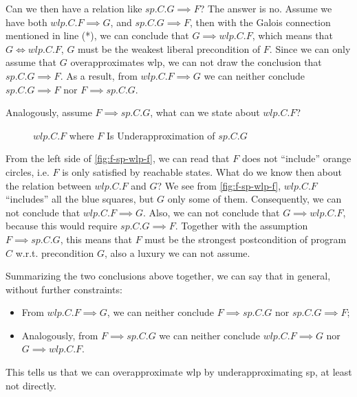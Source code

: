 Can we then have a relation like $sp.C.G\implies F$? 
The answer is no. Assume we have both $wlp.C.F\implies G$, and $sp.C.G\implies F$, then with the Galois connection mentioned in line (*), we can conclude that $G\implies wlp.C.F$, which means that $G\Leftrightarrow wlp.C.F$, $G$ must be  the weakest liberal precondition of $F$. 
Since we can only assume that $G$ overapproximates wlp, we can not draw the conclusion that $sp.C.G\implies F$. 
As a result, from $wlp.C.F\implies G$ we can neither conclude $sp.C.G\implies F$ nor $F\implies sp.C.G$. 

Analogously, assume $F\implies sp.C.G$, what can we state about $wlp.C.F$?
\begin{figure}[ht]
	\centering
	
	\caption{$wlp.C.F$ where $F$ Is Underapproximation of $sp.C.G$}
	\label{fig:f-sp-wlp-f}
\end{figure}
From the left side of \autoref{fig:f-sp-wlp-f}, we can read that $F$ does not ``include'' orange circles, i.e. $F$ is only satisfied by reachable states. 
What do we know then about the relation between $wlp.C.F$ and $G$? 
We see from \autoref{fig:f-sp-wlp-f}, $wlp.C.F$ ``includes'' all the blue squares, but $G$ only some of them. 
Consequently, we can not conclude that $wlp.C.F\implies G$. 
Also, we can not conclude that $G\implies wlp.C.F$, because this would require $sp.C.G\implies F$. 
Together with the assumption $F\implies sp.C.G$, this means that $F$ must be  the strongest postcondition of program $C$ w.r.t. precondition $G$, also a luxury we can not assume. 

Summarizing the two conclusions above together, we can say that in general, without further constraints: 
\begin{itemize}
	\item From $wlp.C.F\implies G$, we can neither conclude $F\implies sp.C.G$ nor $sp.C.G\implies F$;
	\item Analogously, from $F\implies sp.C.G$ we can neither conclude $wlp.C.F\implies G$ nor $G\implies wlp.C.F$. 
\end{itemize}
This tells us that we can  overapproximate wlp by underapproximating sp, at least not directly. 





